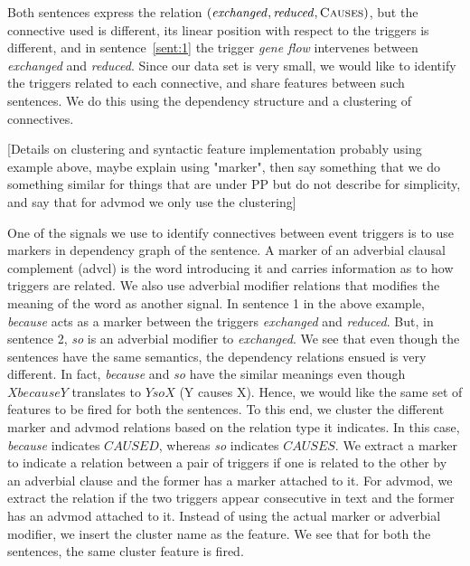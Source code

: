 Both sentences express the relation $(\mbox{\emph{exchanged}},\mbox{\emph{reduced}},\mbox{\textsc{Causes}})$, but the connective used is different, its linear position with respect to the triggers is different, and in sentence~\ref{sent:1} the trigger \emph{gene flow} intervenes between \emph{exchanged} and \emph{reduced}. Since our data set is very small, we would like to identify the triggers related to each connective, and share features between such sentences. We do this using the dependency structure and a clustering of connectives.

[Details on clustering and syntactic feature implementation probably using example above, maybe explain using "marker", then say something that we do something similar for things that are under PP but do not describe for simplicity, and say that for advmod we only use the clustering]

One of the signals we use to identify connectives between event triggers is to use markers in dependency graph of the sentence. A marker of an adverbial clausal complement (advcl) is the word introducing it and carries information as to how triggers are related. We also use adverbial modifier relations that modifies the meaning of the word as another signal. In sentence 1 in the above example, \emph{because} acts as a marker between the triggers \emph{exchanged} and  \emph{reduced}. But, in sentence 2, \emph{so} is an adverbial modifier to \emph{exchanged}. We see that even though the sentences have the same semantics, the dependency relations ensued is very different. In fact, \emph{because} and \emph{so} have the similar meanings even though $X because Y$ translates to $Y so X$ (Y causes X). Hence, we would like the same set of features to be fired for both the sentences. To this end, we cluster the different marker and advmod relations based on the relation type it indicates. In this case, \emph{because} indicates $CAUSED$, whereas \emph{so} indicates $CAUSES$. We extract a marker to indicate a relation between a pair of triggers if one is related to the other by an adverbial clause and the former has a marker attached to it. For advmod, we extract the relation if the two triggers appear consecutive in text and the former has an advmod attached to it. Instead of using the actual marker or adverbial modifier, we insert the cluster name as the feature. We see that for both the sentences, the same cluster feature is fired.

